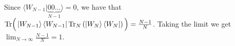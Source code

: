 \documentclass[12pt]{article}
\begin{document}
\begin{enumerate}
\begin{enumerate}
	Since $\langle W_{N-1}|\underbrace{00\ldots}_{N-1}\rangle = 0$, we have that $\mathrm{Tr}\Big(\left| W_{N-1} \right\rangle \left\langle W_{N-1} \right| \mathrm{Tr}_N\left(\left| W_N \right\rangle \left\langle W_N \right|\right)\Big) = \frac{N-1}{N}$. Taking the limit we get $\lim_{N\rightarrow\infty}\frac{N-1}{N} = 1$.
\end{enumerate}


\end{enumerate}
\end{document}
